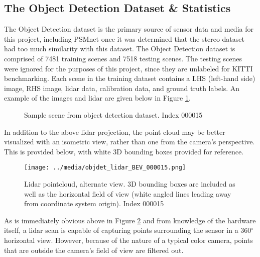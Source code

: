 \subsection{The Object Detection Dataset \& Statistics}
The Object Detection dataset is the primary source of sensor data and media for this project, including PSMnet once it was determined that the stereo dataset had too much similarity with this dataset. The Object Detection dataset is comprised of 7481 training scenes and 7518 testing scenes. The testing scenes were ignored for the purposes of this project, since they are unlabeled for KITTI benchmarking. Each scene in the training dataset contains a LHS (left-hand side) image, RHS image, lidar data, calibration data, and ground truth labels. An example of the images and lidar are given below in Figure \ref{objdet_sample}. 

\begin{figure}[H]
    \centering
    \caption{Sample scene from object detection dataset. Index 000015}
    \label{objdet_sample}
\end{figure}

In addition to the above lidar projection, the point cloud may be better visualized with an isometric view, rather than one from the camera's perspective. This is provided below, with white 3D bounding boxes provided for reference.

\begin{figure}[H]
    \texttt{[image: ../media/objdet\_lidar\_BEV\_000015.png]}
    \caption{Lidar pointcloud, alternate view. 3D bounding boxes are included as well as the horizontal field of view (white angled lines leading away from coordinate system origin). Index 000015}
    \label{objdet_lidar_sample}
\end{figure}

\def \DEG{$^{\circ}$} %

As is immediately obvious above in Figure \ref{objdet_lidar_sample} and from knowledge of the hardware itself, a lidar scan is capable of capturing points surrounding the sensor in a 360\DEG horizontal view. However, because of the nature of a typical color camera, points that are outside the camera's field of view are filtered out. 

